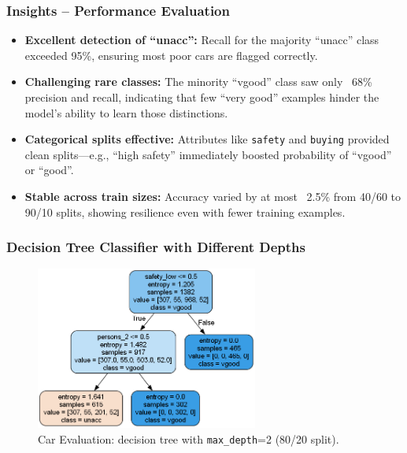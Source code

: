 \subsubsection*{Insights – Performance Evaluation}
\begin{itemize}
	\item \textbf{Excellent detection of “unacc”:} Recall for the majority “unacc” class exceeded 95\%, ensuring most poor cars are flagged correctly.
	\item \textbf{Challenging rare classes:} The minority “vgood” class saw only ~68\% precision and recall, indicating that few “very good” examples hinder the model’s ability to learn those distinctions.
	\item \textbf{Categorical splits effective:} Attributes like \texttt{safety} and \texttt{buying} provided clean splits—e.g., “high safety” immediately boosted probability of “vgood” or “good”.
	\item \textbf{Stable across train sizes:} Accuracy varied by at most ~2.5\% from 40/60 to 90/10 splits, showing resilience even with fewer training examples.
\end{itemize}

\clearpage
\subsubsection*{Decision Tree Classifier with Different Depths}
\begin{figure}[H]
	\centering
	\includegraphics[width=0.65\textwidth]{imgs/dt-mini/dt__car_evaluation__80_vs_20__2.png}
	\caption{Car Evaluation: decision tree with \texttt{max\_depth}=2 (80/20 split).}\label{fig:ce-dt-depth-2}
\end{figure}


